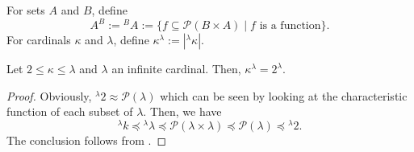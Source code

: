 \begin{definition}
    For sets $A$ and $B$, define 
    \begin{equation*}
        A^B := {}^BA := \{f\subseteq\mathscr P(B\times A)\mid f \text{ is a function}\}.
    \end{equation*}
    For cardinals $\kappa$ and $\lambda$, define $\kappa^\lambda := |{}^\lambda\kappa|$.
\end{definition}

\begin{theorem}
    Let $2\le\kappa\le\lambda$ and $\lambda$ an infinite cardinal. Then, $\kappa^\lambda = 2^\lambda$.
\end{theorem}
\begin{proof}
    Obviously, ${}^\lambda 2\approx\mathscr P(\lambda)$ which can be seen by looking at the characteristic function of each subset of $\lambda$. Then, we have 
    \begin{equation*}
        {}^\lambda k\preceq{}^\lambda\lambda\preceq\mathscr P(\lambda\times\lambda)\preceq\mathscr P(\lambda)\preceq{}^\lambda 2.
    \end{equation*}
    The conclusion follows from .
\end{proof}

